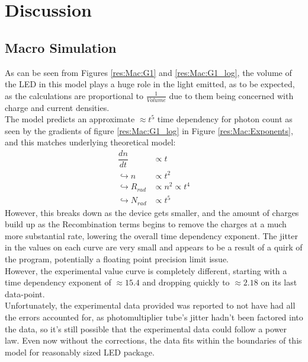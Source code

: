 \documentclass[titlepage]{article}
\begin{document}
\section{Discussion}
\subsection{Macro Simulation}
As can be seen from Figures \ref{res:Mac:G1} and \ref{res:Mac:G1_log}, the volume of the LED in this model plays a huge role in the light emitted, as to be expected, as the calculations are proportional to $\frac{1}{Volume}$ due to them being concerned with charge and current densities.\\
The model predicts an approximate $\approx t^5$ time dependency for photon count as seen by the gradients of figure \ref{res:Mac:G1_log} in Figure \ref{res:Mac:Exponents}, and this matches underlying theoretical model:
\begin{eqnarray}
\dfrac{dn}{dt} &\propto t \\
\hookrightarrow n &\propto t^2 \\
\hookrightarrow R_{rad} &\propto n^2 \propto t^4 \\
\hookrightarrow N_{rad}	&\propto t^5
\end{eqnarray} 
However, this breaks down as the device gets smaller, and the amount of charges build up as the Recombination terms begins to remove the charges at a much more substantial rate, lowering the overall time dependency exponent. The jitter in the values on each curve are very small and appears to be a result of a quirk of the program, potentially a floating point precision limit issue. \\
However, the experimental value curve is completely different, starting with a time dependency exponent of $\approx 15.4$
and dropping quickly to $\approx 2.18$ on its last data-point. \\
Unfortunately, the experimental data provided was reported to not have had all the errors accounted for, as photomultiplier tube's jitter hadn't been factored into the data, so it's still possible that the experimental data could follow a power law. Even now without the corrections, the data fits within the boundaries of this model for reasonably sized LED package. \\
 
\end{document}
